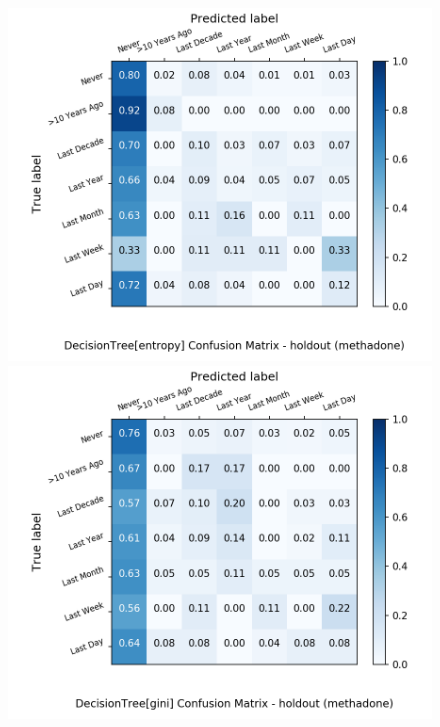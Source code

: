 \begin{figure}[H]
	\centering
	\begin{minipage}[b]{0.32\textwidth}
		\includegraphics[width=1.1\textwidth]{Plots/methadone_DecisionTree_entropy_balance_False_holdout.png}
	\end{minipage}
	\begin{minipage}[b]{0.32\textwidth}
		\includegraphics[width=1.1\textwidth]{Plots/methadone_DecisionTree_gini_balance_False_holdout.png}
	\end{minipage}
	\begin{minipage}[b]{0.32\textwidth}

\end{minipage}
\end{figure}
